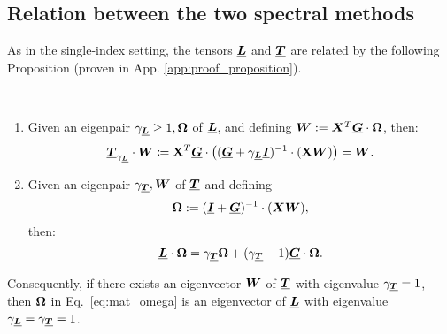 \subsection{Relation between the two spectral methods}
 As in the single-index setting, the tensors ${\underline{\bm{L}}}$ and ${\underline{\bm{T}}}$ are related by the following Proposition (proven in App. \ref{app:proof_proposition}).
\begin{proposition}
\label{proposition:maillard}
~
\begin{enumerate}[leftmargin=2em,wide=1pt]
    \item Given an eigenpair $\gamma_{\underline{\bm{L}}} \geq 1, \boldsymbol{\Omega}$ of ${\underline{\bm{L}}}$, and defining 
    $
        {\boldsymbol W} := {\boldsymbol X}^T{\underline{\bm{G}}}\cdot\boldsymbol{\Omega}
   $,    then:
\begin{equation}       {\ensuremath{\underline{\bm{T}}}}_{\gamma_{\underline{\bm{L}}}}\cdot{\boldsymbol W}\coloneqq  \boldsymbol{\mathbf{X}}^T{\underline{\bm{G}}}\cdot\left(({\underline{\bm{G}}}+\gamma_{\underline{\bm{L}}}{\underline{\bm{I}}})^{-1}\cdot(\boldsymbol{\mathbf{X}}\bm{W})\right)= {\boldsymbol W}.
    \end{equation}
    \item Given an eigenpair $\gamma_{\underline{\bm{T}}}, {\boldsymbol W}$ of ${\underline{\bm{T}}}$ and defining
    \begin{equation}
    \label{eq:mat_omega}
        \boldsymbol{\Omega} := ({\underline{\bm{I}}} + {\underline{\bm{G}}})^{-1}\cdot({\boldsymbol X}{\boldsymbol W}),
    \end{equation}
    then:
    \begin{equation}
        {\ensuremath{\underline{\bm{L}}}}\cdot\boldsymbol{\Omega} = \gamma_{\underline{\bm{T}}}\boldsymbol{\Omega} + (\gamma_{\underline{\bm{T}}} - 1){\underline{\bm{G}}}\cdot\boldsymbol{\Omega}.
    \end{equation}
\end{enumerate}
Consequently, if there exists an eigenvector ${\boldsymbol W}$ of ${\underline{\bm{T}}}$ with eigenvalue $\gamma_{\underline{\bm{T}}} = 1$, then $\boldsymbol{\Omega}$ in Eq.~\eqref{eq:mat_omega} is an eigenvector of ${\underline{\bm{L}}}$ with eigenvalue $\gamma_{{\underline{\bm{L}}}} = \gamma_{{\underline{\bm{T}}}} = 1$.
\end{proposition}